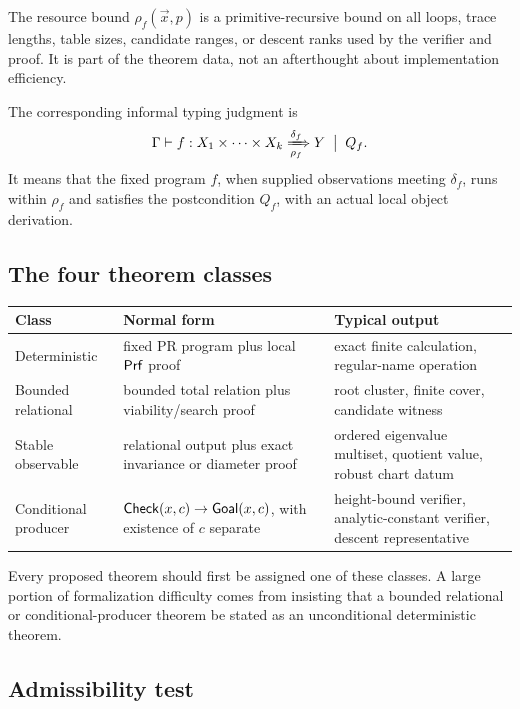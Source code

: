 \begin{definition}[Resource]
The resource bound \(\rho_f(\vec x,p)\) is a primitive-recursive bound on all loops, trace lengths, table sizes, candidate ranges, or descent ranks used by the verifier and proof.  It is part of the theorem data, not an afterthought about implementation efficiency.
\end{definition}

The corresponding informal typing judgment is
\[
   \Gamma\vdash
   f : X_1\times\cdots\times X_k
   \xRightarrow[\rho_f]{\delta_f}
   Y
   \;\bigm|\; Q_f .
\]
It means that the fixed program \(f\), when supplied observations meeting \(\delta_f\), runs within \(\rho_f\) and satisfies the postcondition \(Q_f\), with an actual local object derivation.

\subsection{The four theorem classes}

\begin{center}
\begin{tabularx}{\textwidth}{@{}p{}X X@{}}
\toprule
Class & Normal form & Typical output \\
\midrule
Deterministic & fixed PR program plus local \(\mathsf{Prf}\) proof & exact finite calculation, regular-name operation \\
Bounded relational & bounded total relation plus viability/search proof & root cluster, finite cover, candidate witness \\
Stable observable & relational output plus exact invariance or diameter proof & ordered eigenvalue multiset, quotient value, robust chart datum \\
Conditional producer & \(\mathsf{Check}(x,c)\to\mathsf{Goal}(x,c)\), with existence of \(c\) separate & height-bound verifier, analytic-constant verifier, descent representative \\
\bottomrule
\end{tabularx}
\end{center}

Every proposed theorem should first be assigned one of these classes.  A large portion of formalization difficulty comes from insisting that a bounded relational or conditional-producer theorem be stated as an unconditional deterministic theorem.

\subsection{Admissibility test}

